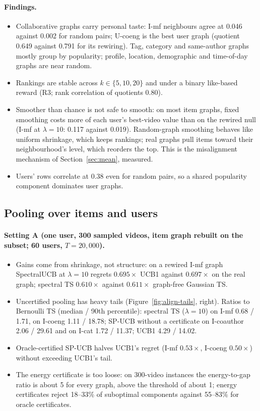 \documentclass[11pt]{article}
\theoremstyle{definition}
\theoremstyle{remark}
\begin{document}
\paragraph{Findings.}
\begin{itemize}
\item Collaborative graphs carry personal taste: I-mf neighbours agree at 0.046 against 0.002 for random pairs; U-coeng is the best user graph (quotient 0.649 against 0.791 for its rewiring). Tag, category and same-author graphs mostly group by popularity; profile, location, demographic and time-of-day graphs are near random.
\item Rankings are stable across $k\in\{5,10,20\}$ and under a binary like-based reward (R3; rank correlation of quotients 0.80).
\item Smoother than chance is not safe to smooth: on most item graphs, fixed smoothing costs more of each user's best-video value than on the rewired null (I-mf at $\lambda=10$: 0.117 against 0.019). Random-graph smoothing behaves like uniform shrinkage, which keeps rankings; real graphs pull items toward their neighbourhood's level, which reorders the top. This is the misalignment mechanism of Section~\ref{sec:mean}, measured.
\item Users' rows correlate at 0.38 even for random pairs, so a shared popularity component dominates user graphs.
\end{itemize}

\subsection{Pooling over items and users}

\paragraph{Setting A (one user, 300 sampled videos, item graph rebuilt on the subset; 60 users, $T=20{,}000$).}
\begin{itemize}
\item Gains come from shrinkage, not structure: on a rewired I-mf graph SpectralUCB at $\lambda=10$ regrets $0.695\times$ UCB1 against $0.697\times$ on the real graph; spectral TS $0.610\times$ against $0.611\times$ graph-free Gaussian TS.
\item Uncertified pooling has heavy tails (Figure~\ref{fig:align-tails}, right). Ratios to Bernoulli TS (median / 90th percentile): spectral TS ($\lambda=10$) on I-mf 0.68 / 1.71, on I-coeng 1.11 / 18.78; SP-UCB without a certificate on I-coauthor 2.06 / 29.61 and on I-cat 1.72 / 11.37; UCB1 4.29 / 14.02.
\item Oracle-certified SP-UCB halves UCB1's regret (I-mf $0.53\times$, I-coeng $0.50\times$) without exceeding UCB1's tail.
\item The energy certificate is too loose: on 300-video instances the energy-to-gap ratio is about 5 for every graph, above the threshold of about 1; energy certificates reject 18--33\% of suboptimal components against 55--83\% for oracle certificates.
\end{itemize}
\end{document}
